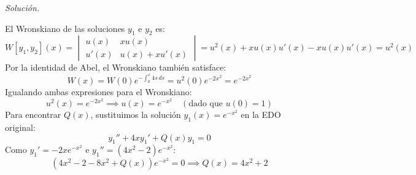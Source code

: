 \documentclass[12pt,letterpaper]{article}
\begin{document}
\medskip
\textit{Solución.}

El Wronskiano de las soluciones $y_1$ e $y_2$ es:
\[
  W[y_1, y_2](x) = \begin{vmatrix} u(x) & xu(x) \\ u'(x) & u(x) + xu'(x) \end{vmatrix} = u^2(x) + x u(x)u'(x) - x u(x)u'(x) = u^2(x)
\]
Por la identidad de Abel, el Wronskiano también satisface:
\[
  W(x) = W(0) e^{-\int_0^x 4s\,ds} = u^2(0) e^{-2x^2} = e^{-2x^2}
\]
Igualando ambas expresiones para el Wronskiano:
\[
  u^2(x) = e^{-2x^2} \implies u(x) = e^{-x^2} \quad (\text{dado que } u(0) = 1)
\]
Para encontrar $Q(x)$, sustituimos la solución $y_1(x) = e^{-x^2}$ en la EDO original:
\[
  y_1'' + 4x y_1' + Q(x)y_1 = 0
\]
Como $y_1' = -2x e^{-x^2}$ e $y_1'' = (4x^2 - 2) e^{-x^2}$:
\[
  \left( 4x^2 - 2 - 8x^2 + Q(x) \right) e^{-x^2} = 0 \implies Q(x) = 4x^2 + 2
\]
\end{document}
